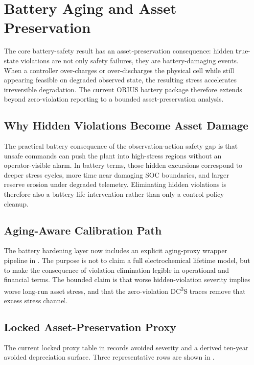 \section{Battery Aging and Asset Preservation}\label{sec:aging_asset}

The core battery-safety result has an asset-preservation consequence: hidden
true-state violations are not only safety failures, they are battery-damaging
events.  When a controller over-charges or over-discharges the physical cell
while still appearing feasible on degraded observed state, the resulting
stress accelerates irreversible degradation.  The current ORIUS battery
package therefore extends beyond zero-violation reporting to a bounded
asset-preservation analysis.

\subsection{Why Hidden Violations Become Asset Damage}

The practical battery consequence of the observation-action safety gap is that
unsafe commands can push the plant into high-stress regions without an
operator-visible alarm.  In battery terms, those hidden excursions correspond
to deeper stress cycles, more time near damaging SOC boundaries, and larger
reserve erosion under degraded telemetry.  Eliminating hidden violations is
therefore also a battery-life intervention rather than only a control-policy
cleanup.

\subsection{Aging-Aware Calibration Path}

The battery hardening layer now includes an explicit aging-proxy wrapper
pipeline in .  The purpose is not
to claim a full electrochemical lifetime model, but to make the consequence of
violation elimination legible in operational and financial terms.  The bounded
claim is that worse hidden-violation severity implies worse long-run asset
stress, and that the zero-violation DC\textsuperscript{3}S traces remove that
excess stress channel.

\subsection{Locked Asset-Preservation Proxy}

The current locked proxy table in
 records avoided
severity and a derived ten-year avoided depreciation surface.  Three
representative rows are shown in .

